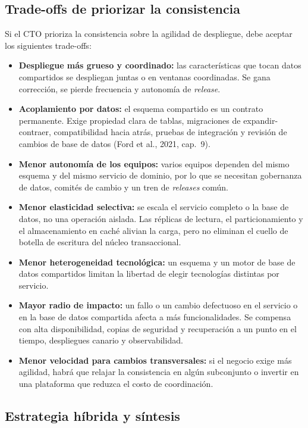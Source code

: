 \documentclass[12pt,a4paper]{article}
\begin{document}
\subsection{Trade-offs de priorizar la consistencia}

Si el CTO prioriza la consistencia sobre la agilidad de despliegue, debe aceptar los siguientes trade-offs:

\begin{itemize}[label=$\cdot$]
  \item \textbf{Despliegue más grueso y coordinado:} las características que tocan datos compartidos se despliegan juntas o en ventanas coordinadas. Se gana corrección, se pierde frecuencia y autonomía de \emph{release}.
  \item \textbf{Acoplamiento por datos:} el esquema compartido es un contrato permanente. Exige propiedad clara de tablas, migraciones de expandir-contraer, compatibilidad hacia atrás, pruebas de integración y revisión de cambios de base de datos (Ford et al., 2021, cap.~9).
  \item \textbf{Menor autonomía de los equipos:} varios equipos dependen del mismo esquema y del mismo servicio de dominio, por lo que se necesitan gobernanza de datos, comités de cambio y un tren de \emph{releases} común.
  \item \textbf{Menor elasticidad selectiva:} se escala el servicio completo o la base de datos, no una operación aislada. Las réplicas de lectura, el particionamiento y el almacenamiento en caché alivian la carga, pero no eliminan el cuello de botella de escritura del núcleo transaccional.
  \item \textbf{Menor heterogeneidad tecnológica:} un esquema y un motor de base de datos compartidos limitan la libertad de elegir tecnologías distintas por servicio.
  \item \textbf{Mayor radio de impacto:} un fallo o un cambio defectuoso en el servicio o en la base de datos compartida afecta a más funcionalidades. Se compensa con alta disponibilidad, copias de seguridad y recuperación a un punto en el tiempo, despliegues canario y observabilidad.
  \item \textbf{Menor velocidad para cambios transversales:} si el negocio exige más agilidad, habrá que relajar la consistencia en algún subconjunto o invertir en una plataforma que reduzca el costo de coordinación.
\end{itemize}

\subsection{Estrategia híbrida y síntesis}
\end{document}
